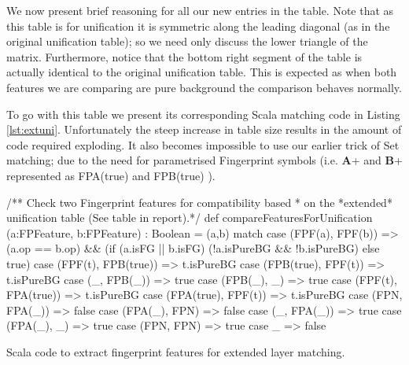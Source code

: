 We now present brief reasoning for all our new entries in the table.
Note that as this table is for unification it is symmetric along the leading diagonal (as in
the original unification table); so we need only discuss the lower triangle of the matrix.
Furthermore, notice that the bottom right segment of the table is actually identical to
the original unification table. This is expected as when both features we are comparing
are pure background the comparison behaves normally.


To go with this table we present its corresponding Scala matching code in Listing \ref{lst:extuni}.
Unfortunately the steep increase in table size results in the amount of code required exploding.
It also becomes impossible to use our earlier trick of Set matching; due to the need for parametrised
Fingerprint symbols (i.e. \textbf{A}+ and \textbf{B}+ represented as FPA(true) and FPB(true) ).
\begin{listing}[H]
\begin{scalacode}
 /** Check two Fingerprint features for compatibility based
   * on the *extended* unification table (See table in report).*/
  def compareFeaturesForUnification (a:FPFeature, b:FPFeature) : Boolean = 
  (a,b) match {
    case (FPF(a), FPF(b))    => (a.op == b.op) && 
                                (if (a.isFG || b.isFG) 
                                    (!a.isPureBG && !b.isPureBG)
                                 else true)
    case (FPF(t), FPB(true)) => t.isPureBG
    case (FPB(true), FPF(t)) => t.isPureBG
    case (_, FPB(_))         => true
    case (FPB(_), _)         => true
    case (FPF(t), FPA(true)) => t.isPureBG
    case (FPA(true), FPF(t)) => t.isPureBG
    case (FPN, FPA(_))       => false
    case (FPA(_), FPN)       => false
    case (_, FPA(_))         => true
    case (FPA(_), _)         => true
    case (FPN, FPN)          => true
    case _                   => false
  }
\end{scalacode}
\caption{Scala code to extract fingerprint features for extended layer matching.}
\label{lst:extuni}
\end{listing}

